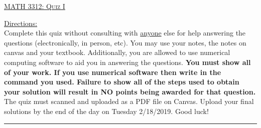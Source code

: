 \documentclass[10pt, a4paper]{article}
\theoremstyle{break}
\begin{document}
\begin{center}
{\large \textsc{\underline{MATH 3312: Quiz I}}}
\vspace{0.125in}
\end{center}
\underline{Directions:} \\
Complete this quiz without consulting with \underline{anyone} else for help answering the questions (electronically, in person, etc). You may use your notes, the notes on canvas and your textbook. Additionally, you are allowed to use numerical computing software to aid you in answering the questions. \textbf{You must show all of your work. If you use numerical software then write in the command you used. Failure to show all of the steps used to obtain your solution will result in NO points being awarded for that question. } 
\noindent The quiz must scanned and uploaded as a PDF file on Canvas. Upload your final solutions by the end of the day on Tuesday 2/18/2019.  Good luck! \\
\noindent\rule{15cm}{0.4pt}

\vspace{0.25in}
\end{document}
